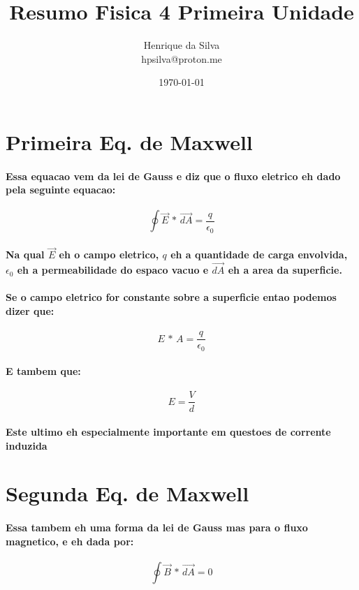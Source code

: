 \documentclass[12pt,twoside, a4paper, twocolumn]{article}
\title{Resumo Fisica 4 Primeira Unidade}
\author{Henrique da Silva \\ hpsilva@proton.me}
\date{\today}
\begin{document}
\maketitle
{}
\newpage
\tableofcontents
\newpage

\newcommand\deriv[2]{\frac{\mathrm d #1}{\mathrm d #2}}

\section{Primeira Eq. de Maxwell}
\paragraph{Essa equacao vem da lei de Gauss e diz que o fluxo eletrico eh dado pela seguinte equacao:
}
\begin{equation}
    \oint \vec{E} \, * \, \vec{dA} = \frac{q}{\epsilon_0}
\end{equation}
\paragraph*{Na qual $\vec{E}$ eh o campo eletrico, $q$ eh a quantidade de carga envolvida, $\epsilon_0$ eh a permeabilidade do espaco vacuo e $\vec{dA}$ eh a area da superficie.}
\paragraph*{Se o campo eletrico for constante sobre a superficie entao podemos dizer que:}
\begin{equation}
    E \, * \, A = \frac{q}{\epsilon_0}
\end{equation}
\paragraph*{E tambem que:}
\begin{equation}
    E = \frac{V}{d}
\end{equation}
\paragraph*{Este ultimo eh especialmente importante em questoes de corrente induzida}

\section{Segunda Eq. de Maxwell}
\paragraph*{Essa tambem eh uma forma da lei de Gauss mas para o fluxo magnetico, e eh dada por:}
\begin{equation}
    \oint  \vec{B} \, * \, \vec{dA} = 0
\end{equation}
\end{document}
